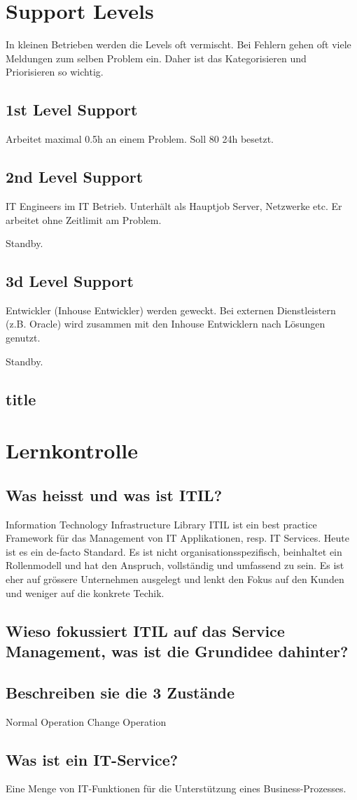 \section{Support Levels}
In kleinen Betrieben werden die Levels oft vermischt.
Bei Fehlern gehen oft viele Meldungen zum selben Problem ein. Daher ist das Kategorisieren und Priorisieren so wichtig.
\subsection{1st Level Support}
Arbeitet maximal 0.5h an einem Problem. Soll 80%
24h besetzt.

\subsection{2nd Level Support}
IT Engineers im IT Betrieb. Unterhält als Hauptjob Server, Netzwerke etc.
Er arbeitet ohne Zeitlimit am Problem.

Standby.

\subsection{3d Level Support}
Entwickler (Inhouse Entwickler) werden geweckt. Bei externen Dienstleistern (z.B. Oracle) wird zusammen mit den Inhouse Entwicklern nach Lösungen genutzt.

Standby.

\subsection{title}
\section{Lernkontrolle}


\subsection{Was heisst und was ist ITIL?}

Information Technology Infrastructure Library
ITIL ist ein best practice Framework für das Management von IT Applikationen, resp. IT Services. Heute ist es ein de-facto Standard. Es ist nicht organisationsspezifisch, beinhaltet ein Rollenmodell und hat den Anspruch, vollständig und umfassend zu sein. Es ist eher auf grössere Unternehmen ausgelegt und lenkt den Fokus auf den Kunden und weniger auf die konkrete Techik.

\subsection{Wieso fokussiert ITIL auf das Service Management, was ist die Grundidee dahinter?}


\subsection{Beschreiben sie die 3 Zustände}
Normal Operation
Change Operation





\subsection{Was ist ein IT-Service?}

Eine Menge von IT-Funktionen für die Unterstützung eines Business-Prozesses. 